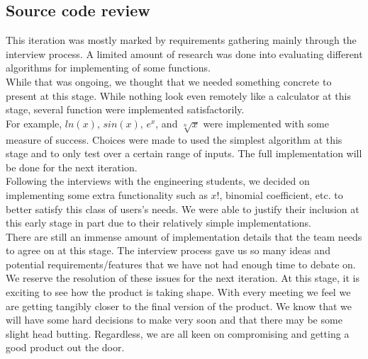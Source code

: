 \documentclass{article}
\begin{document}
\subsection{Source code review}

This iteration was mostly marked by requirements gathering mainly through the interview process. A limited amount of research was done into evaluating different algorithms for implementing of some functions. \\

While that was ongoing, we thought that we needed something concrete to present at this stage. While nothing look even remotely like a calculator at this stage, several function were implemented satisfactorily. \\

For example, $ln(x)$, $sin(x)$, $e^x$, and $\sqrt[n]{x}$ were implemented with some measure of success. Choices were made to used the simplest algorithm at this stage and to only test over a certain range of inputs. The full implementation will be done for the next iteration. \\

Following the interviews with the engineering students, we decided on implementing some extra functionality such as $x!$, binomial coefficient, etc. to better satisfy this class of users's needs. We were able to justify their inclusion at this early stage in part due to their relatively simple implementations. \\

There are still an immense amount of implementation details that the team needs to agree on at this stage. The interview process gave us so many ideas and potential requirements/features that we have not had enough time to debate on. We reserve the resolution of these issues for the next iteration. At this stage, it is exciting to see how the product is taking shape. With every meeting we feel we are getting tangibly closer to the final version of the product. We know that we will have some hard decisions to make very soon and that there may be some slight head butting. Regardless, we are all keen on compromising and getting a good product out the door.
\end{document}
